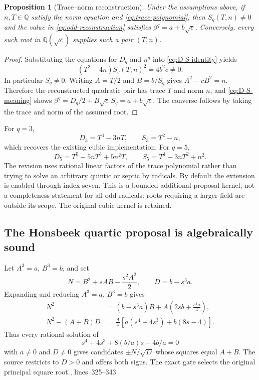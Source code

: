 \documentclass[11pt,a4paper]{article}
\newcommand{\Q}{\mathbb Q}\newcommand{\C}{\mathbb C}
\newcommand{\src}[1]{\cite{source}, lines~#1}
\newtheorem{proposition}{Proposition}[section]
\theoremstyle{definition}\newtheorem{definition}[proposition]{Definition}
\theoremstyle{remark}\newtheorem{remark}[proposition]{Remark}
\begin{document}
\begin{proposition}[Trace--norm reconstruction]
Under the assumptions above, if $n,T\in\Q$ satisfy the norm equation and
\eqref{eq:trace-polynomial}, then $S_q(T,n)\ne0$ and the value in
\eqref{eq:odd-reconstruction} satisfies $\beta^q=a+b\sqrt c$.
Conversely, every such root in $\Q(\sqrt c)$ supplies such a pair $(T,n)$.
\end{proposition}
\begin{proof}
Substituting the equations for $D_q$ and $n^q$ into
\eqref{eq:D-S-identity} yields
\begin{equation}
 (T^2-4n)S_q(T,n)^2=4b^2c\ne0.
\end{equation}
In particular $S_q\ne0$. Writing $A=T/2$ and $B=b/S_q$ gives
$A^2-cB^2=n$. Therefore the reconstructed quadratic pair has trace $T$ and
norm $n$, and \eqref{eq:D-S-meaning} shows
$\beta^q=D_q/2+B\sqrt c\,S_q=a+b\sqrt c$.
The converse follows by taking the trace and norm of the assumed root.
\end{proof}

For $q=3$,
\begin{equation}
 D_3=T^3-3nT,\qquad S_3=T^2-n,
\end{equation}
which recovers the existing cubic implementation. For $q=5$,
\begin{equation}
 D_5=T^5-5nT^3+5n^2T,\qquad
 S_5=T^4-3nT^2+n^2.
\end{equation}
The revision uses rational linear factors of the trace polynomial rather than
trying to solve an arbitrary quintic or septic by radicals. By default the
extension is enabled through index seven. This is a bounded additional proposal
kernel, not a completeness statement for all odd radicals: roots requiring a
larger field are outside its scope. The original cubic kernel is retained.

\subsection{The Honsbeek quartic proposal is algebraically sound}
Let $A^3=a$, $B^3=b$, and set
\begin{equation}
 N=B^2+sAB-\frac{s^2A^2}{2},\qquad D=b-s^3a.
\end{equation}
Expanding and reducing $A^3=a$, $B^3=b$ gives
\begin{align}
 N^2&=(b-s^3a)B+A\left(2sb+\frac{s^4a}{4}\right),\\
 N^2-(A+B)D
 &=\frac A4\left[a(s^4+4s^3)+b(8s-4)\right].\label{eq:honsbeek}
\end{align}
Thus every rational solution of
\begin{equation}
 s^4+4s^3+8(b/a)s-4b/a=0
\end{equation}
with $a\ne0$ and $D\ne0$ gives candidates $\pm N/\sqrt D$ whose squares equal
$A+B$. The source restricts to $D>0$ and offers both signs. The exact gate
selects the original principal square root.\src{325--343}
\end{document}

